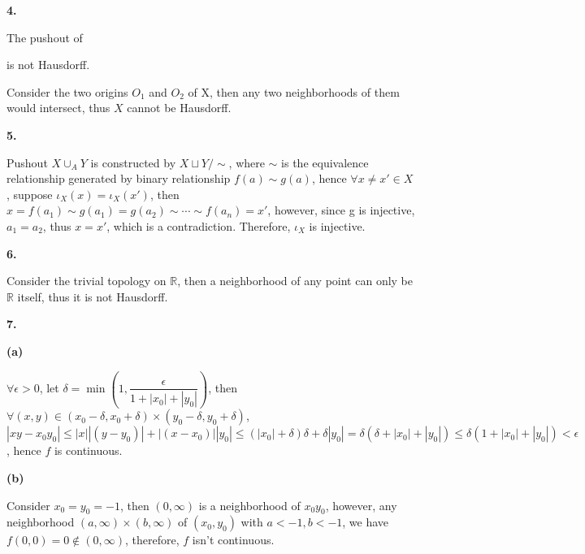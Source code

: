 \documentclass{article}
\begin{document}
\textbf{4.} \par\noindent
The pushout of 
\begin{center}
\end{center}
is not Hausdorff. \par\noindent
Consider the two origins $O_{1}$ and $O_{2}$ of X, then any two neighborhoods of them would intersect, thus $X$ cannot be Hausdorff. \par\par\noindent
\textbf{5.} \par\noindent
Pushout $X\cup_{A}Y$ is constructed by $X\sqcup Y / \sim$, where $\sim$ is the equivalence relationship generated by binary relationship $f(a)\sim g(a)$, hence $\forall x\neq x'\in X$, suppose $\iota_{X}(x)=\iota_{X}(x')$, then $ x = f(a_{1}) \sim g(a_{1}) = g(a_{2}) \sim \cdots \sim f(a_{n}) = x' $, however, since g is injective, $a_{1}=a_{2}$, thus $x=x'$, which is a contradiction. Therefore, $\iota_{X}$ is injective. \par\par\noindent
\textbf{6.} \par\noindent
Consider the trivial topology on $\mathbb{R}$, then a neighborhood of any point can only be $\mathbb{R}$ itself, thus it is not Hausdorff. \par\par\noindent
\textbf{7.} \par\noindent
\textbf{(a)} \par\noindent
$\forall \epsilon>0$, let $\delta=\min\left(1,\dfrac{\epsilon}{1+|x_{0}|+|y_{0}|}\right)$, then $\forall (x,y)\in(x_{0}-\delta,x_{0}+\delta)\times(y_{0}-\delta,y_{0}+\delta)$, $|xy-x_{0}y_{0}|\leq|x||(y-y_{0})|+|(x-x_{0})||y_{0}|\leq(|x_{0}|+\delta)\delta+\delta|y_{0}|=\delta(\delta+|x_{0}|+|y_{0}|)\leq\delta(1+|x_{0}|+|y_{0}|) < \epsilon$, hence $f$ is continuous. \par\noindent
\textbf{(b)} \par\noindent
Consider $x_{0}=y_{0}=-1$, then $(0,\infty)$ is a neighborhood of $x_{0}y_{0}$, however, any neighborhood $(a,\infty)\times(b,\infty)$ of $(x_{0},y_{0})$ with $a<-1,b<-1$, we have $f(0,0)=0\notin (0,\infty)$, therefore, $f$ isn't continuous.
\end{document}
